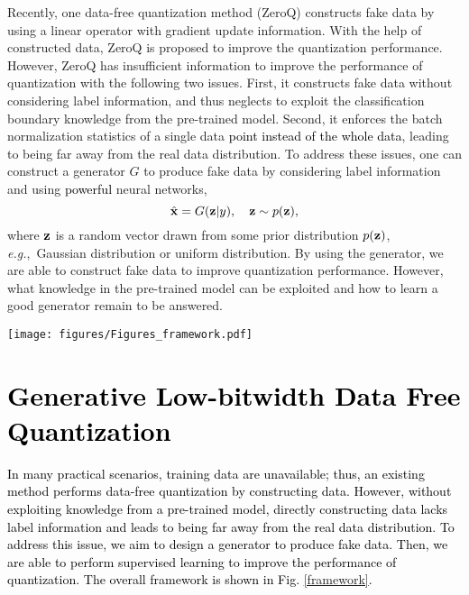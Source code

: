 \documentclass[runningheads]{llncs}
\def\eg{\emph{e.g}\onedot}
\def\eg{\mbox{\textit{e.g.}, }}
\def\bx{{\bf x}}
\def\bz{{\bf z}}
\def\bx{{\bf x}}
\def\bz{{\bf z}}
\def\mytitle{\textcolor{black}{Generative Low-bitwidth Data Free Quantization }}
\def\jie{\textcolor{black}}
\def\wrong{\textcolor{black}}
\def\new{\textcolor{black}}
\begin{document}
Recently, one data-free quantization method (ZeroQ) \cite{Cai_2020_CVPR} constructs fake data by using a linear operator with gradient update information.
With the help of constructed data, ZeroQ is proposed to improve the quantization performance.
However, ZeroQ has insufficient information to improve the performance of quantization with the following two issues.
First, it constructs fake data without considering label information, and thus neglects to exploit the classification boundary knowledge from the pre-trained model. 
Second, it enforces the batch normalization statistics of a single data \new{point instead of the whole data}, leading to being far away from the real data distribution.
To address these issues, one can construct a generator $G$ to produce fake data by considering label information and using \new{powerful} neural networks,
\begin{equation}
    \hat{\bx} =G(\bz|y),\quad \bz \sim p(\bz), 
\end{equation}
where $\bz$ is a random vector drawn from some prior distribution $p(\bz)$, \eg Gaussian distribution or uniform distribution.
By using the generator, we are able to construct fake data to improve quantization performance. 
However, what knowledge in the pre-trained model can be exploited and how to learn a good generator remain to be answered.



\begin{figure*}[t]
\vskip 0.2in
\begin{center}
\centerline{\texttt{[image: figures/Figures\_framework.pdf]}}
\caption{An overview of the proposed method. Given Gaussian noise and \new{the} label as input, the generator creates fake data and feeds them into both \new{the} full-precision model and \new{the} quantized model. The fixed full-precision model provides knowledge for updating the generator. The quantized model learns latent knowledge from the generator and the full-precision model.}
\label{framework}
\end{center}
\vskip -0.2in
\end{figure*}


\section{{\mytitle}}
\label{Method}

\jie{
In many practical scenarios, training data are unavailable\new{; thus,}  an existing method \cite{Cai_2020_CVPR} performs data-free quantization by constructing data.
\wrong{However, without exploiting knowledge from a pre-trained model, directly \new{constructing} data lacks label information and leads to \new{being} far away from the real data distribution.}
To address \new{this issue}, we aim to design a generator to produce fake data.
Then, we are able to perform supervised learning to improve the performance of quantization. 
The overall framework is shown in Fig. \ref{framework}.
}
\end{document}
